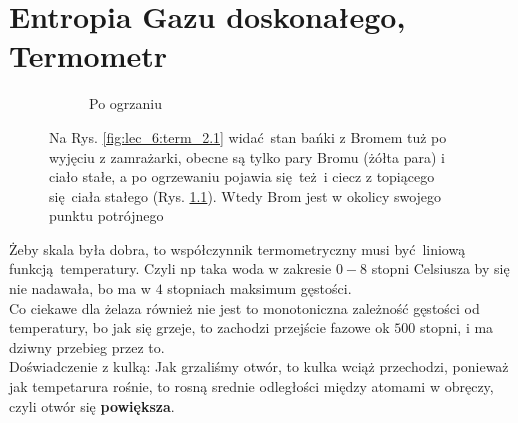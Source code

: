 \documentclass[12pt,a4paper]{report}
\renewcommand{\emph}{\textbf}
\newenvironment{lecture}[1]{\par\medskip
   \noindent\chapter{#1} \rmfamily}{\medskip}
\begin{document}
\begin{lecture}{Entropia Gazu doskonałego, Termometr}
\begin{figure}[ht!]
\begin{subfigure}[b]{0.4\textwidth}
             \caption{Po ogrzaniu}
             \label{fig:lec_6:term_2.2}
         \end{subfigure}
        \caption{Na Rys. \ref{fig:lec_6:term_2.1} widać stan bańki z Bromem tuż po wyjęciu z zamrażarki, obecne są tylko pary Bromu (żółta para) i ciało stałe, a po ogrzewaniu pojawia się też i ciecz z topiącego się ciała stałego (Rys. \ref{fig:lec_6:term_2.2}). Wtedy Brom jest w okolicy swojego punktu potrójnego}
        \label{fig:lec_6:term_2}
     \end{figure}
    Żeby skala była dobra, to współczynnik termometryczny musi być liniową funkcją temperatury. Czyli np taka woda w zakresie $0-8$ stopni Celsiusza by się nie nadawała, bo ma w $4$ stopniach maksimum gęstości.\\
    Co ciekawe dla żelaza również nie jest to monotoniczna zależność gęstości od temperatury, bo jak się grzeje, to zachodzi przejście fazowe ok $500$ stopni, i ma dziwny przebieg przez to.\\
    Doświadczenie z kulką: Jak grzaliśmy otwór, to kulka wciąż przechodzi, ponieważ jak tempetarura rośnie, to rosną srednie odległości między atomami w obręczy, czyli otwór się \emph{powiększa}.

\end{lecture}

\end{document}
